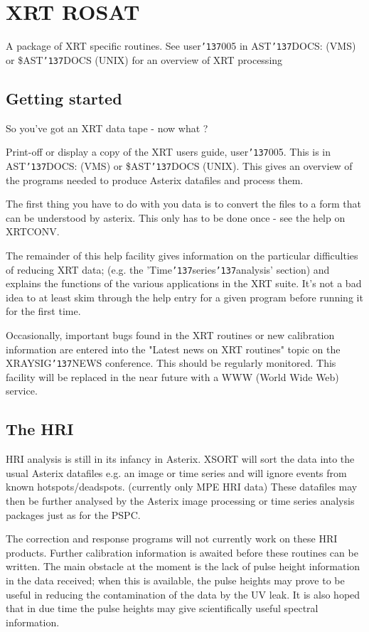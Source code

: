 \documentclass{book}
\renewcommand{\_}{{\tt\char'137}}     %
\begin{document}
\section{XRT ROSAT}
A package of XRT specific routines. See user\_005 in AST\_DOCS:
(VMS) or \$AST\_DOCS (UNIX) for an overview of XRT processing
\subsection{Getting started}
So you've got an XRT data tape - now what ?
 
Print-off or display a copy of the XRT users guide, user\_005. This
is in AST\_DOCS: (VMS) or \$AST\_DOCS (UNIX). This gives an
overview of the programs needed to produce Asterix datafiles and process
them.
 
The first thing you have to do with you data is to convert the files to a form
that can be understood by asterix. This only has to be done once - see the
help on XRTCONV.
 
The remainder of this help facility gives information on the particular
difficulties of reducing XRT data; (e.g. the 'Time\_series\_analysis' section)
and explains the functions of the various applications in the XRT suite.
It's not a bad idea to at least skim through the help entry for a given
program before running it for the first time.
 
Occasionally, important bugs found in the XRT routines or new calibration
information are entered into the "Latest news on XRT routines" topic
on the XRAYSIG\_NEWS conference. This should be regularly monitored.
This facility will be replaced in the near future with a WWW (World Wide
Web) service.
 
\subsection{The HRI}
HRI analysis is still in its infancy in Asterix. XSORT will sort the
data into the usual Asterix datafiles e.g. an image or time series
and will ignore events from known hotspots/deadspots. (currently only
MPE HRI data) These datafiles may then be further analysed by the
Asterix image processing or time series analysis packages just as for
the PSPC.
 
The correction and response programs will not currently
work on these HRI products. Further calibration information is awaited
before these routines can be written. The main obstacle at the moment
is the lack of pulse height information in the data received; when this
is available, the pulse heights may prove to be useful in reducing the
contamination of the data by the UV leak. It is also hoped that in due
time the pulse heights may give scientifically useful spectral
information.
 
\end{document}
